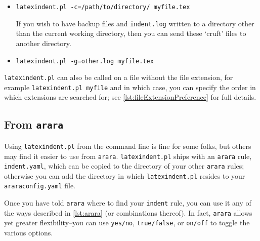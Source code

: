\documentclass[11pt]{article}
\newcommand{\verbitem}[1]{\small\PVerb{#1}}
\newcommand{\fixthis}[1]
{%
	\marginpar{\huge \color{red} \framebox{FIX}}%
	\typeout{FIXTHIS: p\thepage : #1^^J}%
}
\begin{document}
\begin{itemize}[labelsep=.25cm]
	\item[\verbitem{-c, --cruft=<directory>}]\lstinline!latexindent.pl -c=/path/to/directory/ myfile.tex!

	      If you wish to have backup files and \lstinline!indent.log! written to a directory
	      other than the current working directory, then you can send these `cruft' files
	      to another directory.
	\item[\verbitem{-g, --logfile}] \lstinline!latexindent.pl -g=other.log myfile.tex!
      \fixthis{update this}
\end{itemize}

\lstinline!latexindent.pl! can also be called on a file without the file extension, for
example \lstinline[breaklines=true,breakatwhitespace=true,]!latexindent.pl myfile! and in which case, you can specify
the order in which extensions are searched for; see \vref{lst:fileExtensionPreference}
for full details.

\subsection{From \lstinline!arara!}\label{sec:arara}
Using \lstinline!latexindent.pl! from the command line is fine for some folks, but
others may find it easier to use from \lstinline!arara!. \lstinline!latexindent.pl!
ships with an \lstinline!arara! rule, \lstinline!indent.yaml!, which can be copied
to the directory of
your other \lstinline!arara! rules; otherwise  you can add the directory in which \lstinline!latexindent.pl!
resides to your \lstinline!araraconfig.yaml! file.

Once you have told \lstinline!arara! where to find your \lstinline!indent! rule,
you can use it any of the ways described in \cref{lst:arara} (or combinations thereof).
In fact, \lstinline!arara! allows yet greater flexibility--you can use \lstinline!yes/no!, \lstinline!true/false!, or \lstinline!on/off! to toggle the various options.

\end{document}
